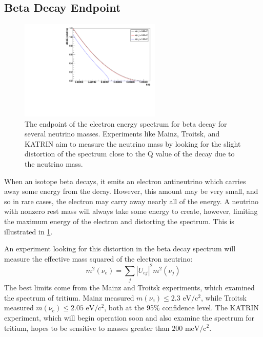 \documentclass[herrin-thesis.tex]{subfiles}
\begin{document}
\subsection{Beta Decay Endpoint}
\begin{figure}
	\centering
	\includegraphics[width=0.6\textwidth]{./plots/nu_beta_endpt.pdf}
	\caption[Beta decay spectrum endpoint for massive neutrinos]{The endpoint of the electron energy spectrum for beta decay for several neutrino masses. Experiments like Mainz, Troitsk, and KATRIN aim to measure the neutrino mass by looking for the slight distortion of the spectrum close to the Q value of the decay due to the neutrino mass.}
	\label{fig:nu_beta_endpt}
\end{figure}

When an isotope beta decays, it emits an electron antineutrino which carries away some energy from the decay. However, this amount may be very small, and so in rare cases, the electron may carry away nearly all of the energy. A neutrino with nonzero rest mass will always take some energy to create, however, limiting the maximum energy of the electron and distorting the spectrum. This is illustrated in \cref{fig:nu_beta_endpt}.

An experiment looking for this distortion in the beta decay spectrum will measure the effective mass squared of the electron neutrino:
\begin{equation}
m^2\left(\nu_e\right) = \sum_j \left | U_{e j} \right |^2 m^2\left(\nu_j\right)
\label{eq:nu_beta_endpt_mass}
\end{equation}
The best limits come from the Mainz and Troitsk experiments, which examined the spectrum of tritium. Mainz measured \(m(\nu_e) \leq 2.3 \text{ eV}/\text{c}^{2}\)\cite{Kraus:2005nx}, while Troitsk measured \(m(\nu_e) \leq 2.05 \text{ eV}/\text{c}^{2}\)\cite{Aseev:2011dq}, both at the 95\% confidence level. The KATRIN experiment, which will begin operation soon and also examine the spectrum for tritium, hopes to be sensitive to masses greater than \(200\text{ meV}/\text{c}^2\)\cite{Osipowicz:2001oq}.
\end{document}
